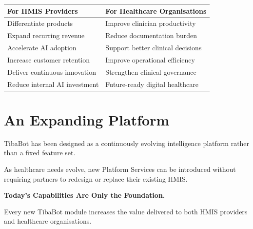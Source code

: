 \begin{center}

\renewcommand{\arraystretch}{1.4}

\begin{tabularx}{\textwidth}{|Y|Y|}

\hline


\textbf{For HMIS Providers} &
\textbf{For Healthcare Organisations} \\

\hline

Differentiate products &
Improve clinician productivity \\

\hline

Expand recurring revenue &
Reduce documentation burden \\

\hline

Accelerate AI adoption &
Support better clinical decisions \\

\hline

Increase customer retention &
Improve operational efficiency \\

\hline

Deliver continuous innovation &
Strengthen clinical governance \\

\hline

Reduce internal AI investment &
Future-ready digital healthcare \\

\hline

\end{tabularx}

\end{center}


\section{An Expanding Platform}

TibaBot has been designed as a continuously evolving intelligence platform rather than a fixed feature set.

As healthcare needs evolve, new Platform Services can be introduced without requiring partners to redesign or replace their existing HMIS.

\vspace{6mm}

\begin{callout}

\centering

\Large

\textbf{Today's Capabilities Are Only the Foundation.}

\vspace{5mm}

\Large

Every new TibaBot module increases the value delivered to both HMIS providers and healthcare organisations.

\end{callout}
